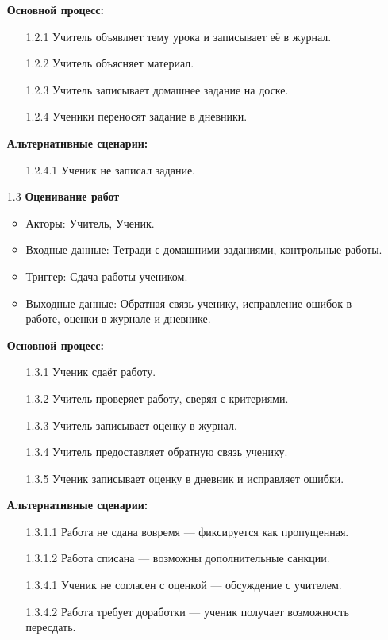 \documentclass[a4paper, final]{article}
\begin{document}
\begin{enumerate}
  \textbf{Основной процесс:}
  \begin{enumerate}
    \item[1.2.1] Учитель объявляет тему урока и записывает её в журнал.
    \item[1.2.2] Учитель объясняет материал.
    \item[1.2.3] Учитель записывает домашнее задание на доске.
    \item[1.2.4] Ученики переносят задание в дневники.
  \end{enumerate}

  \textbf{Альтернативные сценарии:}
  \begin{itemize}
    \item[1.2.4.1] Ученик не записал задание.
  \end{itemize}

  \item[1.3] \textbf{Оценивание работ}
  \begin{itemize}
    \item Акторы: Учитель, Ученик.
    \item Входные данные: Тетради с домашними заданиями, контрольные работы.
    \item Триггер: Сдача работы учеником.
    \item Выходные данные: Обратная связь ученику, исправление ошибок в работе, оценки в журнале и дневнике.
  \end{itemize}

  \textbf{Основной процесс:}
  \begin{enumerate}
    \item[1.3.1] Ученик сдаёт работу.
    \item[1.3.2] Учитель проверяет работу, сверяя с критериями.
    \item[1.3.3] Учитель записывает оценку в журнал.
    \item[1.3.4] Учитель предоставляет обратную связь ученику.
    \item[1.3.5] Ученик записывает оценку в дневник и исправляет ошибки.
  \end{enumerate}

  \textbf{Альтернативные сценарии:}
  \begin{itemize}
    \item[1.3.1.1] Работа не сдана вовремя --- фиксируется как пропущенная.
    \item[1.3.1.2] Работа списана --- возможны дополнительные санкции.
    \item[1.3.4.1] Ученик не согласен с оценкой --- обсуждение с учителем.
    \item[1.3.4.2] Работа требует доработки --- ученик получает возможность пересдать.
  \end{itemize}


\end{enumerate}
\end{document}
